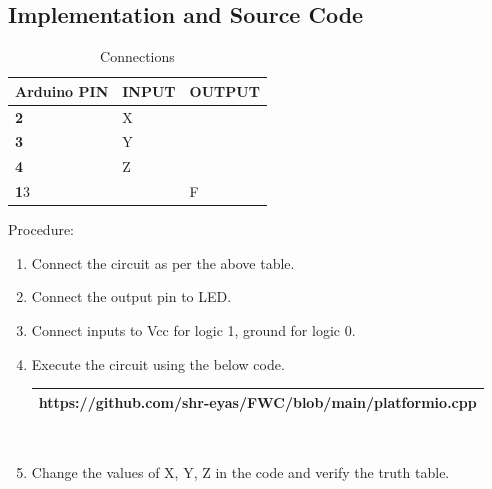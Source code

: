 \documentclass[journal,10pt]{article}
\begin{document}
\subsection{Implementation and Source Code}
\begin{table}[!h]
\begin{center}
  \begin{tabularx}{0.46\textwidth} { 
  | >{\centering\arraybackslash}X 
  | >{\centering\arraybackslash}X 
  | >{\centering\arraybackslash}X  | }
\hline
\textbf{Arduino PIN} & \textbf{INPUT} & \textbf{OUTPUT} \\ 
\hline
\textbf 2 & X & \\
\hline
\textbf 3 & Y & \\
\hline
\textbf 4 & Z & \\
\hline
\textbf 13 & & F \\
\hline
\end{tabularx}
\caption{\label{table:5}Connections}
\end{center}
\end{table}

\begin{flushleft}

Procedure:\\
\begin{enumerate}[label=\alph*.,labelindent=\parindent,leftmargin=*]
    \item Connect the circuit as per the above table.
    \vspace{2pt}
    \item Connect the output pin to LED.
    \vspace{2pt}
    \item Connect inputs to Vcc for logic 1, ground for logic 0.
    \vspace{2pt}
    \item Execute the circuit using the below code.
    \\
    \vspace{7pt}
    \begin{tabularx}{0.8\textwidth} { 
    | >{\centering\arraybackslash}X |}
    \hline
    https://github.com/shr-eyas/FWC/blob/main/platformio.cpp\\
    \hline
    \end{tabularx}
    \\
    \vspace{10pt}
    \item Change the values of X, Y, Z in the code and verify the truth table.\\
    
\end{enumerate}
\end{flushleft}
\end{document}
